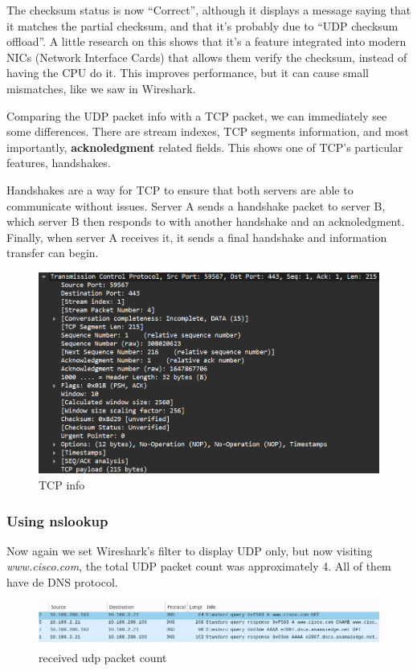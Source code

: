 The checksum status is now ``Correct'', although it displays a message saying
that it matches the partial checksum, and that it's probably due to ``UDP
checksum offload''. A little research on this shows that it's a feature
integrated into modern NICs (Network Interface Cards) that allows them verify
the checksum, instead of having the CPU do it. This improves performance, but
it can cause small mismatches, like we saw in Wireshark.

Comparing the UDP packet info with a TCP packet, we can immediately see some
differences. There are stream indexes, TCP segments information, and most
importantly, \textbf{acknoledgment} related fields. This shows one of TCP's
particular features, handshakes.

Handshakes are a way for TCP to ensure that both servers are able to
communicate without issues. Server A sends a handshake packet to server B,
which server B then responds to with another handshake and an acknoledgment.
Finally, when server A receives it, it sends a final handshake and information
transfer can begin.

\begin{figure}[htbp]
	\centering
	\includegraphics[width=1\linewidth]{img/6.png}
	\caption{TCP info}\label{fig:6}
\end{figure}

\subsubsection{Using nslookup}

Now again we set Wireshark's filter to display UDP only, but now visiting
\textit{www.cisco.com}, the total UDP packet count was approximately 4. All of them have de DNS protocol.\@

\begin{figure}[htbp]
	\centering
	\includegraphics[width=1\linewidth]{img/7.png}
	\caption{received udp packet count}\label{fig:7}
\end{figure}

